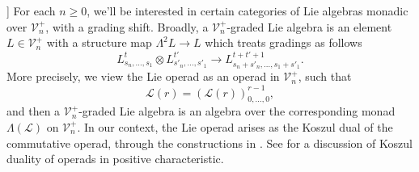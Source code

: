 \documentclass[11pt]{amsart}
\theoremstyle{plain}
\theoremstyle{definition}
\DeclareMathOperator{\im}{im}
\renewcommand{\to}{\longrightarrow}
\newcommand{\scrL}{\mathscr{L}}
\newcommand{\calV}{\mathcal{V}}
\theoremstyle{plain}
\newcommand{\LieOperad}{{\scrL}}
\newcommand{\vect}[2]{\calV^{#1}_{#2}}
\begin{document}
\begin{Lie algebras in characteristic 2 and their homotopy operations}
]%
For each $n\geq0$, we'll be interested in certain categories of Lie algebras monadic over $\vect{+}{n}$, with a grading shift. Broadly, a $\vect{+}{n}$-graded Lie algebra is an element $L\in\vect{+}{n}$ with a structure map $\Lambda^2 L\to L$ which treats gradings as follows
\[L^{t}_{s_n,\ldots,s_1}\otimes L^{t'}_{s'_n,\ldots,s'_1}\to L^{t+t'+1}_{s_n+s'_n,\ldots,s_1+s'_1}.\]
More precisely, we view the Lie operad as an operad in $\vect{+}{n}$, such that
\[\LieOperad(r)=(\LieOperad(r))^{r-1}_{0,\ldots,0},\]
and then a $\vect{+}{n}$-graded Lie algebra is an algebra over the corresponding monad $\Lambda(\LieOperad)$ on $\vect{+}{n}$. In our context, the Lie operad arises as the Koszul dual of the commutative operad, through the constructions in \cite[\S5]{MR1089001}. See \cite[\S5.3.4]{FresseKoszulDuality.pdf} for a discussion of Koszul duality of operads in positive characteristic.


\end{Lie algebras in characteristic 2 and their homotopy operations}
\end{document}
